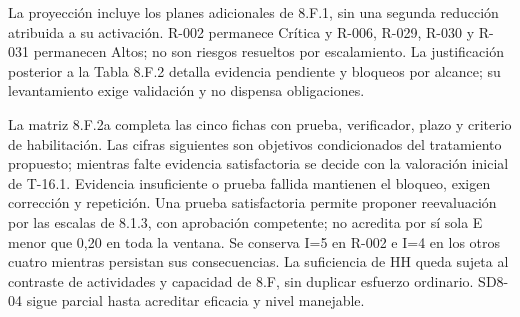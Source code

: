 \documentclass[carta,firma,sinnotas]{lafrox}
\begin{document}
\begingroup
\renewcommand{\thetable}{T-16.2}
\begin{landscape}
\setlength{\textwidth}{\linewidth}
\renewcommand{\arraystretch}{1.08}
La proyección incluye los planes adicionales de 8.F.1, sin una segunda reducción atribuida a su activación. R-002 permanece Crítica y R-006, R-029, R-030 y R-031 permanecen Altos; no son riesgos resueltos por escalamiento. La justificación posterior a la Tabla 8.F.2 detalla evidencia pendiente y bloqueos por alcance; su levantamiento exige validación y no dispensa obligaciones.

La matriz 8.F.2a completa las cinco fichas con prueba, verificador, plazo y criterio
de habilitación. Las cifras siguientes son objetivos condicionados del tratamiento
propuesto; mientras falte evidencia satisfactoria se decide con la valoración
inicial de T-16.1. Evidencia insuficiente o prueba fallida mantienen el bloqueo,
exigen corrección y repetición. Una prueba satisfactoria permite proponer
reevaluación por las escalas de 8.1.3, con aprobación competente; no acredita por
sí sola E menor que 0,20 en toda la ventana. Se conserva I=5 en R-002 e I=4 en los
otros cuatro mientras persistan sus consecuencias. La suficiencia de HH queda
sujeta al contraste de actividades y capacidad de 8.F, sin duplicar esfuerzo
ordinario. SD8-04 sigue parcial hasta acreditar eficacia y nivel manejable.


\end{landscape}
\end{document}
